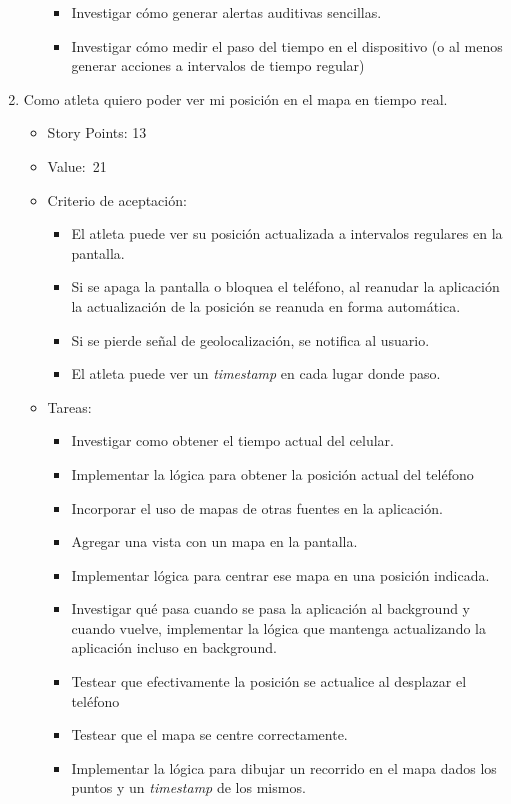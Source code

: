 \begin{enumerate}
\begin{itemize}
    \begin{itemize}
    \item
      Investigar cómo generar alertas auditivas sencillas.
    \item
      Investigar cómo medir el paso del tiempo en el dispositivo (o al
      menos generar acciones a intervalos de tiempo regular)
    \end{itemize}
  \end{itemize}
\item
  Como atleta quiero poder ver mi posición en el mapa en tiempo real.

  \begin{itemize}
  \item
    Story Points: 13
  \item
    Value:~21
  \item
    Criterio de aceptación:

    \begin{itemize}
    \item
      El atleta puede ver su posición actualizada a intervalos regulares
      en la pantalla.
    \item
      Si se apaga la pantalla o bloquea el teléfono, al reanudar la
      aplicación la actualización de la posición se reanuda en forma
      automática.
    \item
      Si se pierde señal de geolocalización, se notifica al usuario.
    \item
      El atleta puede ver un \emph{timestamp} en cada lugar donde paso.
    \end{itemize}
  \item
    Tareas:

    \begin{itemize}
    \item
      Investigar como obtener el tiempo actual del celular.
    \item
      Implementar la lógica para obtener la posición actual del teléfono
    \item
      Incorporar el uso de mapas de otras fuentes en la aplicación.
    \item
      Agregar una vista con un mapa en la pantalla.
    \item
      Implementar lógica para centrar ese mapa en una posición indicada.
    \item
      Investigar qué pasa cuando se pasa la aplicación al background y
      cuando vuelve, implementar la lógica que mantenga actualizando la
      aplicación incluso en background.
    \item
      Testear que efectivamente la posición se actualice al desplazar el
      teléfono
    \item
      Testear que el mapa se centre correctamente.
    \item
      Implementar la lógica para dibujar un recorrido en el mapa dados
      los puntos y un \emph{timestamp} de los mismos.
    \end{itemize}
  \end{itemize}
\end{enumerate}
